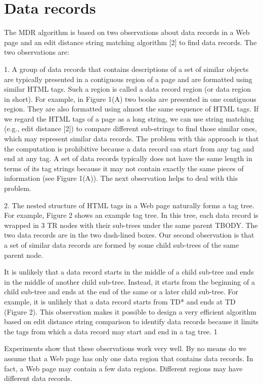 \section{Data records}

The MDR algorithm is based on two observations about data
records in a Web page and an edit distance string matching
algorithm [2] to find data records. The two observations are:

1. A group of data records that contains descriptions of a set of
similar objects are typically presented in a contiguous region
of a page and are formatted using similar HTML tags. Such a
region is called a data record region (or data region in short).
For example, in Figure 1(A) two books are presented in one
contiguous region. They are also formatted using almost the
same sequence of HTML tags. If we regard the HTML tags of
a page as a long string, we can use string matching (e.g., edit
distance [2]) to compare different sub-strings to find those
similar ones, which may represent similar data records.
The problem with this approach is that the computation is
prohibitive because a data record can start from any tag and
end at any tag. A set of data records typically does not have
the same length in terms of its tag strings because it may not
contain exactly the same pieces of information (see Figure
1(A)). The next observation helps to deal with this problem.

2. The nested structure of HTML tags in a Web page naturally
forms a tag tree. For example, Figure 2 shows an example tag
tree. In this tree, each data record is wrapped in 3 TR nodes
with their sub-trees under the same parent TBODY. The two
data records are in the two dash-lined boxes. Our second
observation is that a set of similar data records are formed by
some child sub-trees of the same parent node.

It is unlikely that a data record starts in the middle of a child
sub-tree and ends in the middle of another child sub-tree.
Instead, it starts from the beginning of a child sub-tree and
ends at the end of the same or a later child sub-tree. For
example, it is unlikely that a data record starts from TD* and
ends at TD (Figure 2). This observation makes it possible to
design a very efficient algorithm based on edit distance string
comparison to identify data records because it limits the tags
from which a data record may start and end in a tag tree. 1

Experiments show that these observations work very well. By no
means do we assume that a Web page has only one data region
that contains data records. In fact, a Web page may contain a few
data regions. Different regions may have different data records.

